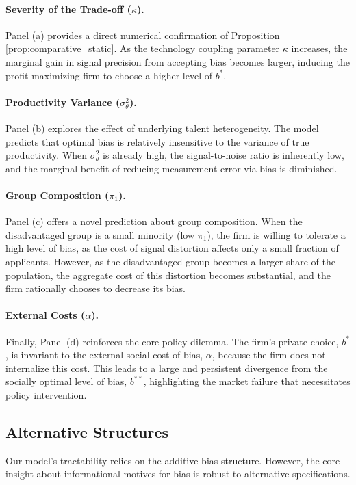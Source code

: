 \paragraph{Severity of the Trade-off ($\kappa$).} Panel (a) provides a direct numerical confirmation of Proposition \ref{prop:comparative_static}. As the technology coupling parameter $\kappa$ increases, the marginal gain in signal precision from accepting bias becomes larger, inducing the profit-maximizing firm to choose a higher level of $b^*$.

\paragraph{Productivity Variance ($\sigma^2_\theta$).} Panel (b) explores the effect of underlying talent heterogeneity. The model predicts that optimal bias is relatively insensitive to the variance of true productivity. When $\sigma^2_\theta$ is already high, the signal-to-noise ratio is inherently low, and the marginal benefit of reducing measurement error via bias is diminished.

\paragraph{Group Composition ($\pi_1$).} Panel (c) offers a novel prediction about group composition. When the disadvantaged group is a small minority (low $\pi_1$), the firm is willing to tolerate a high level of bias, as the cost of signal distortion affects only a small fraction of applicants. However, as the disadvantaged group becomes a larger share of the population, the aggregate cost of this distortion becomes substantial, and the firm rationally chooses to decrease its bias.

\paragraph{External Costs ($\alpha$).} Finally, Panel (d) reinforces the core policy dilemma. The firm's private choice, $b^*$, is invariant to the external social cost of bias, $\alpha$, because the firm does not internalize this cost. This leads to a large and persistent divergence from the socially optimal level of bias, $b^{**}$, highlighting the market failure that necessitates policy intervention.

\subsection{Alternative Structures}
Our model's tractability relies on the additive bias structure. However, the core insight about informational motives for bias is robust to alternative specifications.

